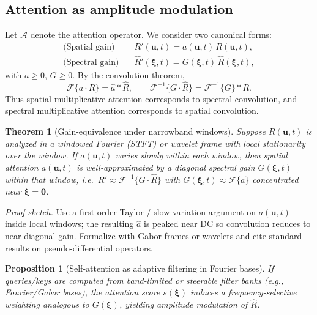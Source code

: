 \documentclass[12pt]{article}
\newtheorem{theorem}{Theorem}
\newtheorem{proposition}{Proposition}
\newcommand{\calA}{\mathcal{A}}      %
\newcommand{\Fourier}{\mathscr{F}}   %
\newcommand{\InvFourier}{\mathscr{F}^{-1}}
\begin{document}
\subsection{Attention as amplitude modulation}
Let $\calA$ denote the attention operator. We consider two canonical forms:
\begin{align}
  \text{(Spatial gain)}\quad & R'(\mathbf{u}, t) = a(\mathbf{u}, t)\, R(\mathbf{u}, t), \\
  \text{(Spectral gain)}\quad & \widehat{R}'(\bm{\xi}, t) = G(\bm{\xi}, t)\, \widehat{R}(\bm{\xi}, t),
\end{align}
with $a \ge 0$, $G \ge 0$.
By the convolution theorem,
\begin{equation}
  \Fourier\!\{ a \cdot R\} = \widehat{a} * \widehat{R},\qquad
  \Fourier^{-1}\!\{ G \cdot \widehat{R}\} = \InvFourier\{G\} * R.
\end{equation}
Thus spatial multiplicative attention corresponds to spectral convolution, and spectral multiplicative attention corresponds to spatial convolution.

\begin{theorem}[Gain-equivalence under narrowband windows]
\label{thm:gain_equiv}
Suppose $R(\mathbf{u},t)$ is analyzed in a windowed Fourier (STFT) or wavelet frame with local stationarity over the window. If $a(\mathbf{u},t)$ varies slowly within each window, then spatial attention $a(\mathbf{u},t)$ is well-approximated by a diagonal spectral gain $G(\bm{\xi},t)$ within that window, i.e.\ $R'\approx \InvFourier\{G\cdot \widehat{R}\}$ with $G(\bm{\xi},t)\approx \Fourier\{a\}$ concentrated near $\bm{\xi}=\mathbf{0}$.
\end{theorem}
\noindent\textit{Proof sketch.} Use a first-order Taylor / slow-variation argument on $a(\mathbf{u},t)$ inside local windows; the resulting $\widehat{a}$ is peaked near DC so convolution reduces to near-diagonal gain. Formalize with Gabor frames or wavelets and cite standard results on pseudo-differential operators. %

\begin{proposition}[Self-attention as adaptive filtering in Fourier bases]
If queries/keys are computed from band-limited or steerable filter banks (e.g., Fourier/Gabor bases), the attention score $s(\bm{\xi})$ induces a frequency-selective weighting analogous to $G(\bm{\xi})$, yielding amplitude modulation of $\widehat{R}$. %
\end{proposition}
\end{document}
